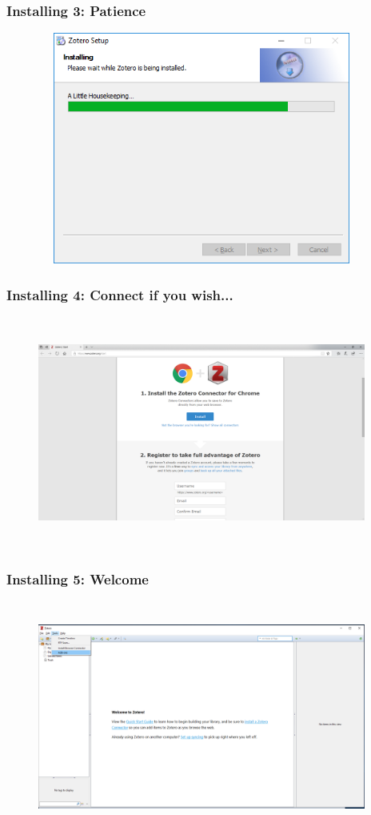 \documentclass[12pt]{beamer}
\begin{document}
\begin{frame} \frametitle{Installing 3: Patience} \begin{figure}[!h] \centering
	\includegraphics[height=3in, width = 4.25in,keepaspectratio]{zotero/install_3.png}
\end{figure} \end{frame}

\begin{frame} \frametitle{Installing 4: Connect if you wish...} \begin{figure}[!h] \centering
	\includegraphics[height=3in, width = 4.25in,keepaspectratio]{zotero/install_4.png}
\end{figure} \end{frame}

\begin{frame} \frametitle{Installing 5: Welcome} \begin{figure}[!h] \centering
	\includegraphics[height=3in, width = 4.25in,keepaspectratio]{zotero/install_5.png}
\end{figure} \end{frame}
\end{document}
